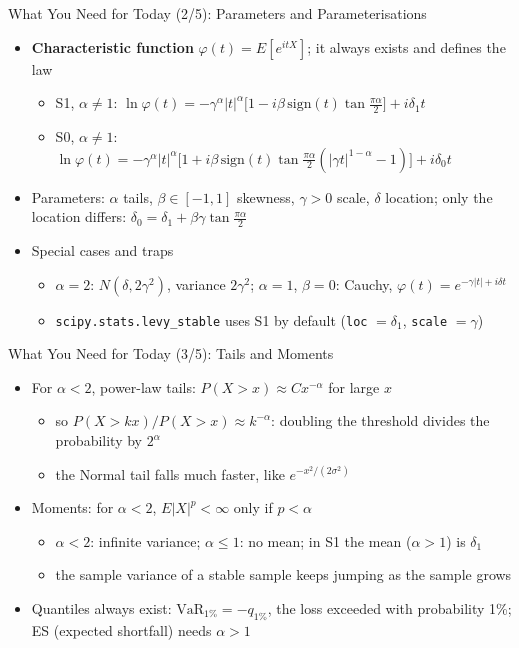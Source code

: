 \begin{frame}{What You Need for Today (2/5): Parameters and Parameterisations}
\itemsize{\small}
\begin{itemize}
    \item \textbf{Characteristic function} $\varphi(t) = E[e^{itX}]$; it always exists and defines the law
    \begin{itemize}
        \item S1, $\alpha \ne 1$: $\ln\varphi(t) = -\gamma^\alpha|t|^\alpha\big[1 - i\beta\,\mathrm{sign}(t)\tan\frac{\pi\alpha}{2}\big] + i\delta_1 t$
        \item S0, $\alpha \ne 1$: $\ln\varphi(t) = -\gamma^\alpha|t|^\alpha\big[1 + i\beta\,\mathrm{sign}(t)\tan\frac{\pi\alpha}{2}(|\gamma t|^{1-\alpha} - 1)\big] + i\delta_0 t$
    \end{itemize}
    \item Parameters: $\alpha$ tails, $\beta \in [-1, 1]$ skewness, $\gamma > 0$ scale, $\delta$ location; only the location differs: $\delta_0 = \delta_1 + \beta\gamma\tan\frac{\pi\alpha}{2}$
    \item Special cases and traps
    \begin{itemize}
        \item $\alpha = 2$: $N(\delta, 2\gamma^2)$, variance $2\gamma^2$; $\alpha = 1$, $\beta = 0$: Cauchy, $\varphi(t) = e^{-\gamma|t| + i\delta t}$
        \item \texttt{scipy.stats.levy\_stable} uses S1 by default (\texttt{loc} $= \delta_1$, \texttt{scale} $= \gamma$)
    \end{itemize}
\end{itemize}
\end{frame}

\begin{frame}{What You Need for Today (3/5): Tails and Moments}
\itemsize{\small}
\begin{itemize}
    \item For $\alpha < 2$, power-law tails: $P(X > x) \approx C x^{-\alpha}$ for large $x$
    \begin{itemize}
        \item so $P(X > kx)/P(X > x) \approx k^{-\alpha}$: doubling the threshold divides the probability by $2^\alpha$
        \item the Normal tail falls much faster, like $e^{-x^2/(2\sigma^2)}$
    \end{itemize}
    \item Moments: for $\alpha < 2$, $E|X|^p < \infty$ only if $p < \alpha$
    \begin{itemize}
        \item $\alpha < 2$: infinite variance; $\alpha \le 1$: no mean; in S1 the mean ($\alpha > 1$) is $\delta_1$
        \item the sample variance of a stable sample keeps jumping as the sample grows
    \end{itemize}
    \item Quantiles always exist: $\mathrm{VaR}_{1\%} = -q_{1\%}$, the loss exceeded with probability 1\%; ES (expected shortfall) needs $\alpha > 1$
\end{itemize}
\end{frame}


